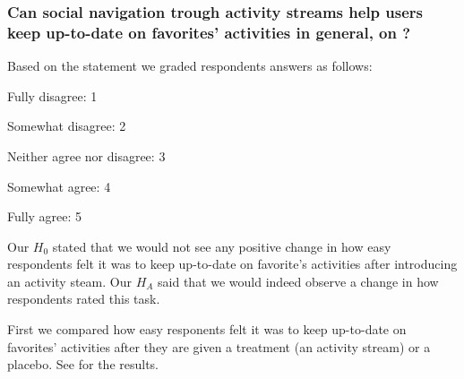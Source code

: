 \subsubsection{%
  Can social navigation trough activity streams help users keep
  up-to-date on favorites' activities in general, on \urort{}?
}

Based on the statement
 we graded respondents answers as follows: 

\begin{items}
  \item Fully disagree: 1
  \item Somewhat disagree: 2
  \item Neither agree nor disagree: 3
  \item Somewhat agree: 4
  \item Fully agree: 5
\end{items}

Our $H_0$ stated that we would not see any positive change in how easy
respondents felt it was to keep up-to-date on favorite's activities
after introducing an activity steam. Our $H_A$ said that we
would indeed observe a change in how respondents rated this task.

First we compared how easy responents felt it was to keep up-to-date on
favorites' activities after they are given a treatment (an activity stream)
or a placebo.
See
 for the results.

\newcommand{\twoguides}{%
  \begin{tikzpicture}
    \draw (-1,1) -- (-1,1);
    \begin{scope}[color=red]
      \draw (-1,0.75) -- (-0.25,0.5);
      \draw (-1,0.2) -- (-0.25,0.45);
    \end{scope}
  \end{tikzpicture}}

